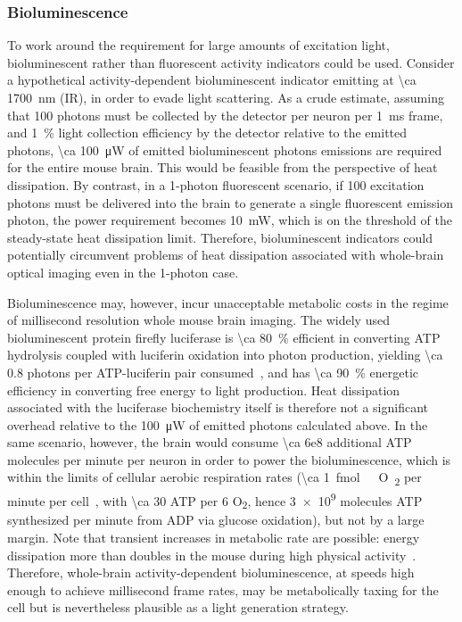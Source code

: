 \subsubsection{Bioluminescence}
To work around the requirement for large amounts of excitation light, bioluminescent rather than fluorescent activity indicators could be used.
Consider a hypothetical activity-dependent bioluminescent indicator emitting at \SI{\ca 1700}{\nano\meter} (IR), in order to evade light scattering.
As a crude estimate, assuming that 100 photons must be collected by the detector per neuron per \SI{1}{\milli\second} frame, and \SI{1}{\percent} light collection efficiency by the detector relative to the emitted photons, \SI{\ca 100}{\micro\watt} of emitted bioluminescent photons emissions are required for the entire mouse brain.
This would be feasible from the perspective of heat dissipation.
By contrast, in a 1-photon fluorescent scenario, if 100 excitation photons must be delivered into the brain to generate a single fluorescent emission photon, the power requirement becomes \SI{10}{\milli\watt}, which is on the threshold of the steady-state heat dissipation limit.
Therefore, bioluminescent indicators could potentially circumvent problems of heat dissipation associated with whole-brain optical imaging even in the 1-photon case.

Bioluminescence may, however, incur unacceptable metabolic costs in the regime of millisecond resolution whole mouse brain imaging.
The widely used bioluminescent protein firefly luciferase is \SI{\ca 80}{\percent} efficient in converting ATP hydrolysis coupled with luciferin oxidation into photon production, yielding \num{\ca 0.8} photons per ATP-luciferin pair consumed~\cite{seliger60}, and has \SI{\ca 90}{\percent} energetic efficiency in converting free energy to light production.
Heat dissipation associated with the luciferase biochemistry itself is therefore not a significant overhead relative to the \SI{100}{\micro\watt} of emitted photons calculated above.
In the same scenario, however, the brain would consume \num{\ca 6e8} additional ATP molecules per minute per neuron in order to power the bioluminescence, which is within the limits of cellular aerobic respiration rates (\SI{\ca 1}{\femto\mole\ O\textsubscript{2}} per minute per cell~\cite{molter09}, with \num{\ca 30} ATP per 6 O\textsubscript{2}, hence \num{3e9} molecules ATP synthesized per minute from ADP via glucose oxidation), but not by a large margin.
Note that transient increases in metabolic rate are possible: energy dissipation more than doubles in the mouse during high physical activity~\cite{speakman13}.
Therefore, whole-brain activity-dependent bioluminescence, at speeds high enough to achieve millisecond frame rates, may be metabolically taxing for the cell but is nevertheless plausible as a light generation strategy.

